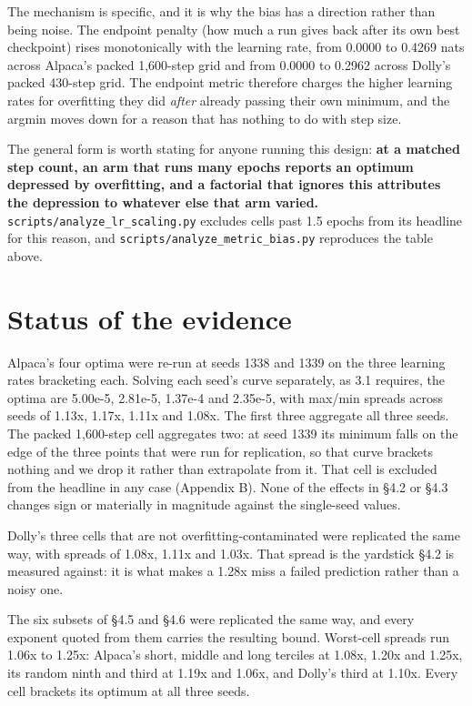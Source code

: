 \documentclass[11pt]{article}
\begin{document}
The mechanism is specific, and it is why the bias has a direction rather than being noise. The endpoint penalty (how much a run gives back after its own best checkpoint) rises monotonically with the learning rate, from 0.0000 to 0.4269 nats across Alpaca's packed 1,600-step grid and from 0.0000 to 0.2962 across Dolly's packed 430-step grid. The endpoint metric therefore charges the higher learning rates for overfitting they did \emph{after} already passing their own minimum, and the argmin moves down for a reason that has nothing to do with step size.

The general form is worth stating for anyone running this design: \textbf{at a matched step count, an arm that runs many epochs reports an optimum depressed by overfitting, and a factorial that ignores this attributes the depression to whatever else that arm varied.} \texttt{scripts/\allowbreak{}analyze\_\allowbreak{}lr\_\allowbreak{}scaling.py} excludes cells past 1.5 epochs from its headline for this reason, and \texttt{scripts/\allowbreak{}analyze\_\allowbreak{}metric\_\allowbreak{}bias.py} reproduces the table above.

\section{Status of the evidence}

Alpaca's four optima were re-run at seeds 1338 and 1339 on the three learning rates bracketing each. Solving each seed's curve separately, as 3.1 requires, the optima are 5.00e-5, 2.81e-5, 1.37e-4 and 2.35e-5, with max/min spreads across seeds of 1.13x, 1.17x, 1.11x and 1.08x. The first three aggregate all three seeds. The packed 1,600-step cell aggregates two: at seed 1339 its minimum falls on the edge of the three points that were run for replication, so that curve brackets nothing and we drop it rather than extrapolate from it. That cell is excluded from the headline in any case (Appendix B). None of the effects in \S{}4.2 or \S{}4.3 changes sign or materially in magnitude against the single-seed values.

Dolly's three cells that are not overfitting-contaminated were replicated the same way, with spreads of 1.08x, 1.11x and 1.03x. That spread is the yardstick \S{}4.2 is measured against: it is what makes a 1.28x miss a failed prediction rather than a noisy one.

The six subsets of \S{}4.5 and \S{}4.6 were replicated the same way, and every exponent quoted from them carries the resulting bound. Worst-cell spreads run 1.06x to 1.25x: Alpaca's short, middle and long terciles at 1.08x, 1.20x and 1.25x, its random ninth and third at 1.19x and 1.06x, and Dolly's third at 1.10x. Every cell brackets its optimum at all three seeds.
\end{document}
